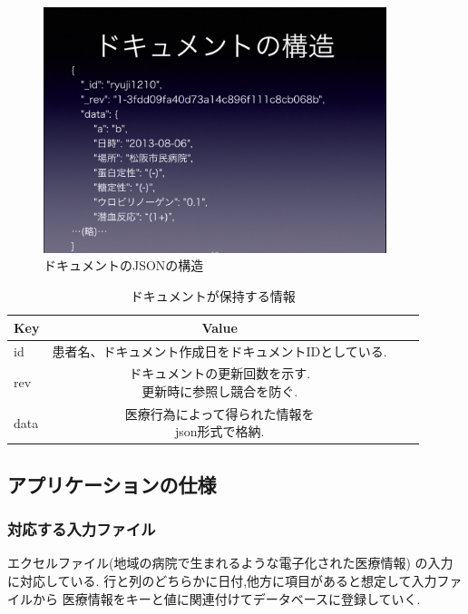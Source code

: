 	\begin{figure}[htbp]
		\begin{center}
			\includegraphics[width=10cm, bb=0 0 1027 737]{./gazou/json-for-doc.png}
		\end{center}
		\caption{ドキュメントのJSONの構造}
		\label{json-for-doc}
	\end{figure}


	\begin{table}[htb]
		\begin{center}
			\caption{ドキュメントが保持する情報}
			\begin{tabular}{|l|c|r|r|}\hline
			Key & Value \\ \hline \hline
			id &  患者名、ドキュメント作成日をドキュメントIDとしている. \\ \hline
			rev & \shortstack{ドキュメントの更新回数を示す. \\ 更新時に参照し競合を防ぐ.} \\ \hline
			data & \shortstack{医療行為によって得られた情報を \\ json形式で格納.} \\ \hline
			\end{tabular}
			\label{tab:doc}
		\end{center}
	\end{table}


\subsection{アプリケーションの仕様}

	\subsubsection{対応する入力ファイル}
	エクセルファイル(地域の病院で生まれるような電子化された医療情報)
	の入力に対応している.
	行と列のどちらかに日付,他方に項目があると想定して入力ファイルから
	医療情報をキーと値に関連付けてデータベースに登録していく.

